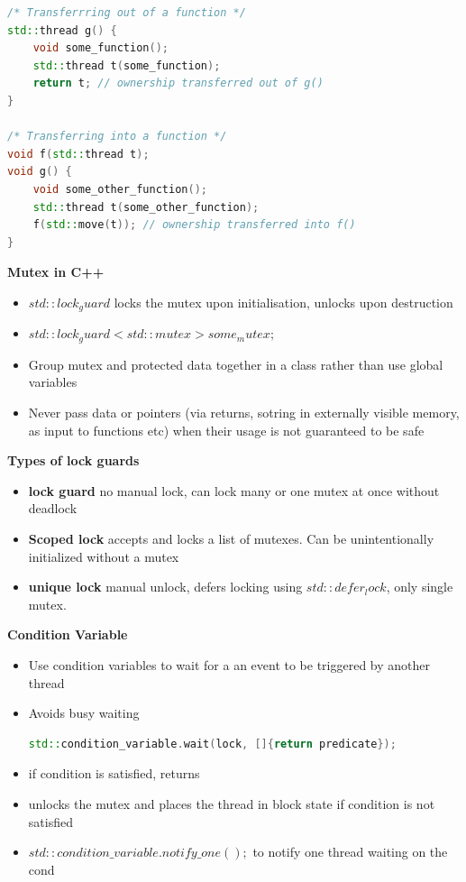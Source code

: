 \documentclass[10pt, landscape]{article}
\begin{document}
\begin{multicols}{4}
\begin{itemize}
\begin{itemize}
\begin{lstlisting}[language=C++, breaklines=true, breakatwhitespace=true]
/* Transferrring out of a function */
std::thread g() {
    void some_function();
    std::thread t(some_function);
    return t; // ownership transferred out of g()
}

/* Transferring into a function */
void f(std::thread t);
void g() {
    void some_other_function();
    std::thread t(some_other_function);
    f(std::move(t)); // ownership transferred into f()
}
    \end{lstlisting}
\end{itemize}


\textbf{Mutex in C++} \\
\begin{itemize}
    \item $std::lock_guard$ locks the mutex upon initialisation, unlocks upon destruction
    \item $std::lock_guard<std::mutex>{some_mutex};$ 
    \item Group mutex and protected data together in a class rather than use global variables
    \item Never pass data or pointers (via returns, sotring in externally visible memory, as input to functions etc) when their usage is not guaranteed to be safe
\end{itemize}


\textbf{Types of lock guards}
\begin{itemize}
    \item \textbf{lock guard} no manual lock, can lock many or one mutex at once without deadlock
    \item \textbf{Scoped lock} accepts and locks a list of mutexes. Can be unintentionally initialized without a mutex
    \item \textbf{unique lock} manual unlock, defers locking using $std::defer_lock$, only single mutex. 
\end{itemize}

\textbf{Condition Variable} \\
\begin{itemize}
    \item Use condition variables to wait for a an event to be triggered by another thread
    \item Avoids busy waiting 
    \begin{lstlisting}[language=C++, breaklines=true, breakatwhitespace=true]
std::condition_variable.wait(lock, []{return predicate});
    \end{lstlisting}
    \item if condition is satisfied, returns
    \item unlocks the mutex and places the thread in block state if condition is not satisfied
    \item $std::condition\_variable.notify\_one();$ to notify one thread waiting on the cond
\end{itemize}



\end{itemize}
\end{multicols}
\end{document}
